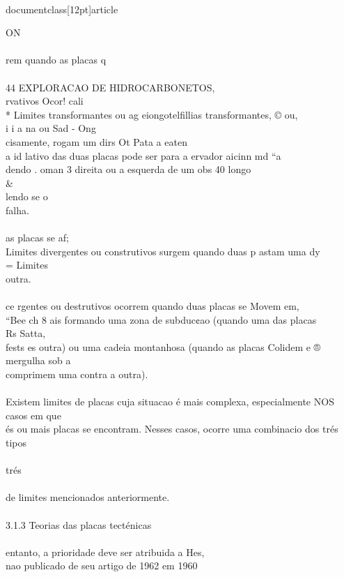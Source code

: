 \\documentclass[12pt]{article}
\begin{document}
ON\\
\\
rem quando as placas q\\
\\
44 EXPLORACAO DE HIDROCARBONETOS,\\
rvativos Ocor! cali\\
* Limites transformantes ou ag eiongotelfillias transformantes, © ou,\\
i i a na ou Sad - Ong\\
cisamente, rogam um dirs Ot Pata a eaten\\
a id lativo das duas placas pode ser para a ervador aicinn md “a\\
dendo . oman 3 direita ou a esquerda de um obs 40 longo \\&\\
lendo se o\\
falha.\\
\\
as placas se af;\\
Limites divergentes ou construtivos surgem quando duas p astam uma dy\\
= Limites\\
outra.\\
\\
ce rgentes ou destrutivos ocorrem quando duas placas se Movem em,\\
“Bee ch 8 ais formando uma zona de subduc¢ao (quando uma das placas\\
Rs Satta,\\
fests es outra) ou uma cadeia montanhosa (quando as placas Colidem e ®\\
mergulha sob a\\
comprimem uma contra a outra).\\
\\
Existem limites de placas cuja situacao é mais complexa, especialmente NOS casos em que\\
és ou mais placas se encontram. Nesses casos, ocorre uma combinacio dos trés tipos\\
\\
trés\\
\\
de limites mencionados anteriormente.\\
\\
3.1.3 Teorias das placas tecténicas\\
\\
entanto, a prioridade deve ser atribuida a Hes,\\
nao publicado de seu artigo de 1962 em 1960\\
\end{document}

